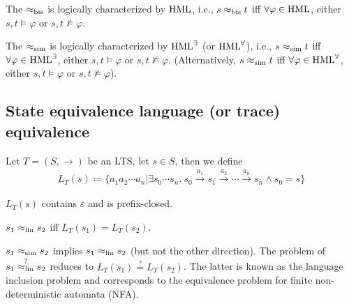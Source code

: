 \begin{theorem}
    The $\approx_{\mathrm{bis}}$ is logically characterized by $\operatorname{HML}$, i.e.,  $s \approx_{\mathrm{bis}} t$ iff $\forall \varphi \in \operatorname{HML}$, either $s,t \models \varphi$ or $s,t \not\models \varphi$. 
\end{theorem}

\begin{theorem}
    The $\approx_{\mathrm{sim}}$ is logically characterized by $\operatorname{HML}^{\exists}$ (or $\operatorname{HML}^{\forall}$), i.e.,
    $s \approx_{\mathrm{sim}} t$ iff $\forall \varphi \in \operatorname{HML} ^\exists$, either $s,t \models \varphi$ or $s,t \not\models \varphi$. (Alternatively,  $s \approx_{\mathrm{sim}} t$  iff $\forall \varphi \in \operatorname{HML} ^\forall$, either $s,t \models \varphi$ or $s,t \not\models \varphi$). 
\end{theorem}


\subsection{State equivalence language (or trace) equivalence}


\begin{definition}
    Let $T= (S, \to)$ be an LTS, let $s\in S$, then we define
    \begin{align*}
        L_T(s) \coloneqq \{ a_1a_2\cdots a_n | \exists s_0 \cdots s_n.\ s_0 \xrightarrow{a_1}  s_1  \xrightarrow{a_2} \cdots \xrightarrow{a_n} s_n \land s_0 = s \}
    \end{align*}
\end{definition}


\begin{lemma}
    $L_T(s)$ contains $\varepsilon$ and is prefix-closed.
\end{lemma}


\begin{definition}
    $s_1 \approx_{\mathrm{lin}} s_2$ iff $L_T(s_1) = L_T(s_2)$.
\end{definition}



\begin{remark}
    $s_1 \approx_{\mathrm{sim}} s_2$ implies $s_1 \approx_{\mathrm{lin}} s_2$ (but not the other direction).
    The problem of $s_1 \stackrel{?}{\approx_{\mathrm{lin}}} s_2$ reduces to $L_T(s_1) \stackrel{?}{=} L_T(s_2)$. 
    The latter is known as the language inclusion problem and corresponds to the equivalence problem for finite non-deterministic automata (NFA).  
\end{remark}

